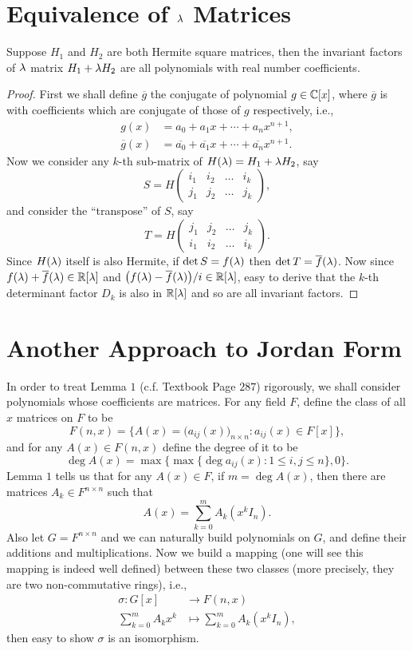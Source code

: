 \section{Equivalence of $\lambda$ Matrices}
\begin{pro}%
	Suppose $H_1$ and $H_2$ are both Hermite square matrices, then the invariant factors of $\lambda$ matrix $H_1+\lambda H_2$ are all polynomials with real number coefficients.
\end{pro}
\begin{proof}
	First we shall define $\overline{g}$ the conjugate of polynomial $g\in \mathbb{C}[x]$, where $\overline{g}$ is with coefficients which are conjugate of those of $g$ respectively, i.e., 
	\begin{align*}
		g(x)&=a_0+a_1x+\cdots+a_n x^{n+1},\\
		\overline{g}(x)&=\overline{a_0}+\overline{a_1}x+\cdots+\overline{a_n} x^{n+1}.
	\end{align*}
	Now we consider any $k$-th sub-matrix of $H(\lambda)=H_1+\lambda H_2$, say 
	\[S=H\begin{pmatrix}
	i_1&i_2&\dots&i_k\\
	j_1&j_2&\dots&j_k
	\end{pmatrix},\]
	and consider the ``transpose'' of $S$, say
	\[T=H\begin{pmatrix}
	j_1&j_2&\dots&j_k\\
	i_1&i_2&\dots&i_k
	\end{pmatrix}.\]
	Since $H(\lambda)$ itself is also Hermite, if $\det S=f(\lambda)$ then $\det T=\overline{f}(\lambda)$. Now since $f(\lambda)+\overline{f}(\lambda)\in \mathbb{R}[\lambda]$ and $\big(f(\lambda)-\overline{f}(\lambda)\big)/i\in \mathbb{R}[\lambda]$, easy to derive that the $k$-th determinant factor $D_k$ is also in $\mathbb{R}[\lambda]$ and so are all invariant factors.
\end{proof}

\section{Another Approach to Jordan Form}
In order to treat Lemma $1$ (c.f. Textbook Page $287$) rigorously, we shall consider polynomials whose coefficients are matrices. For any field $F$, define the class of all $x$ matrices on $F$ to be
\[F(n,x)=\Big\{A(x)=\big(a_{ij}(x)\big)_{n\times n}\colon a_{ij}(x)\in F[x]\Big\},\]
and for any $A(x)\in F(n,x)$ define the degree of it to be
\[\deg A(x)=\max\{\max\{\deg a_{ij}(x)\colon 1\leq i,j\leq n\},0\}.\]
Lemma $1$ tells us that for any $A(x)\in F$, if $m=\deg A(x)$, then there are matrices $A_k \in F^{n\times n}$ such that 
\[A(x)=\sum_{k=0}^m A_k(x^k I_n).\]
Also let $G=F^{n\times n}$ and we can naturally build polynomials on $G$, and define their additions and multiplications. 
Now we build a mapping (one will see this mapping is indeed well defined) between these two classes (more precisely, they are two non-commutative rings), i.e.,
\begin{align*}
	\sigma\colon G[x]&\to F(n,x)\\
				\sum_{k=0}^m A_kx^k&\mapsto \sum_{k=0}^m A_k(x^k I_n),
\end{align*}
then easy to show $\sigma$ is an isomorphism. 

